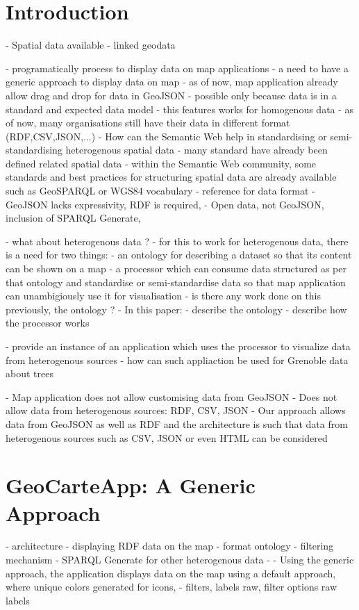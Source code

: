 \documentclass[a4paper,pagenum,english]{rnti}
\affiliation{
    \affil{1}Univ Lyon, MINES Saint-\'Etienne, CNRS, Laboratoire Hubert Curien UMR 5516, \\F-42023 Saint-\'Etienne, France\\
          \{prenom.nom\}@emse.fr\\
    \affil{2}Mondeca, \\ 35 boulevard Strasbourg, Paris, France\\
          ghislain.atemezing@mondeca.com\\
 }
\begin{document}
%
\section{Introduction}
- Spatial data available
	- linked geodata

- programatically process to display data on map applications
- a need to have a generic approach to display data on map
- as of now, map application already allow drag and drop for data in GeoJSON
- possible only because data is in a standard and expected data model
- this features works for homogenous data
- as of now, many organisations still have their data in different format (RDF,CSV,JSON,...)
- How can the Semantic Web help in standardising or semi-standardising heterogenous spatial data
	- many standard have already been defined related spatial data
		- within the Semantic Web community, some standards and best practices for structuring spatial data are already available such as GeoSPARQL or WGS84 vocabulary 
- reference for data format %
- GeoJSON lacks expressivity, RDF is required,
- Open data, not GeoJSON, inclusion of SPARQL Generate,

- what about heterogenous data ?
- for this to work for heterogenous data, there is a need for two things:
	- an ontology for describing a dataset so that its content can be shown on a map
	- a processor which can consume data structured as per that ontology and standardise or semi-standardise 
	data so that map application can unambigiously use it for visualisation
- is there any work done on this previously, the ontology ?
- In this paper:
	- describe the ontology 
	- describe how the processor works
	
	- provide an instance of an application which uses the processor to visualize data from heterogenous sources
	- how can such appliaction be used for Grenoble data about trees

- Map application does not allow customising data from GeoJSON
- Does not allow data from heterogenous sources: RDF, CSV, JSON
- Our approach allows data from GeoJSON as well as RDF and the architecture is such that data from heterogenous sources such as CSV, JSON or even HTML can be considered

\section{ GeoCarteApp: A Generic Approach}
- architecture
- displaying RDF data on the map
- format ontology
- filtering mechanism
- SPARQL Generate for other heterogenous data
- - Using the generic approach, the application displays data on the map using a default approach, where unique colors generated for icons,
- filters, labels raw, filter options raw labels
\end{document}
